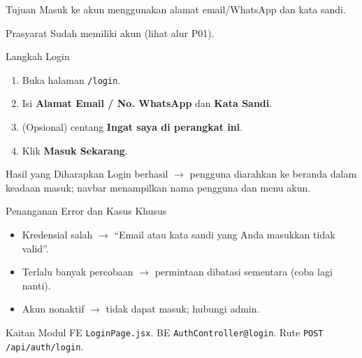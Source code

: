 
\begin{flowsection}{Tujuan}
Masuk ke akun menggunakan alamat email/WhatsApp dan kata sandi.
\end{flowsection}

\begin{flowsection}{Prasyarat}
Sudah memiliki akun (lihat alur P01).
\end{flowsection}

\begin{flowsection}{Langkah Login}
\begin{enumerate}
  \item Buka halaman \texttt{/login}.
  \item Isi \textbf{Alamat Email / No. WhatsApp} dan \textbf{Kata Sandi}.
  \item (Opsional) centang \textbf{Ingat saya di perangkat ini}.
  \item Klik \textbf{Masuk Sekarang}.
\end{enumerate}
\end{flowsection}


\begin{flowsection}{Hasil yang Diharapkan}
Login berhasil $\rightarrow$ pengguna diarahkan ke beranda dalam keadaan masuk;
navbar menampilkan nama pengguna dan menu akun.
\end{flowsection}


\begin{flowsection}{Penanganan Error dan Kasus Khusus}
\begin{itemize}
  \item Kredensial salah $\rightarrow$ ``Email atau kata sandi yang Anda masukkan tidak valid''.
  \item Terlalu banyak percobaan $\rightarrow$ permintaan dibatasi sementara (coba lagi nanti).
  \item Akun nonaktif $\rightarrow$ tidak dapat masuk; hubungi admin.
\end{itemize}
\end{flowsection}

\begin{flowsection}{Kaitan Modul}
FE \texttt{LoginPage.jsx}. BE \texttt{AuthController@login}. Rute
\texttt{POST /api/auth/login}.
\end{flowsection}

